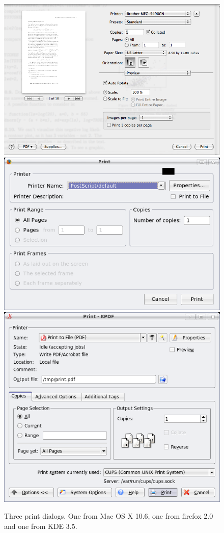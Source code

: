 \begin{figure}
  \centering
  \includegraphics[width=.60\textwidget]{fig-mac-print}
  \\
  \includegraphics[width=.60\textwidth]{firefox-print}
  \\
  \includegraphics[width=.60\textwidth]{kde-print}
  \caption{Three print dialogs. One from Mac OS X 10.6, one from
    firefox 2.0 and one from KDE 3.5.}
  \label{fig:GUI:print-dialogs}
\end{figure}
